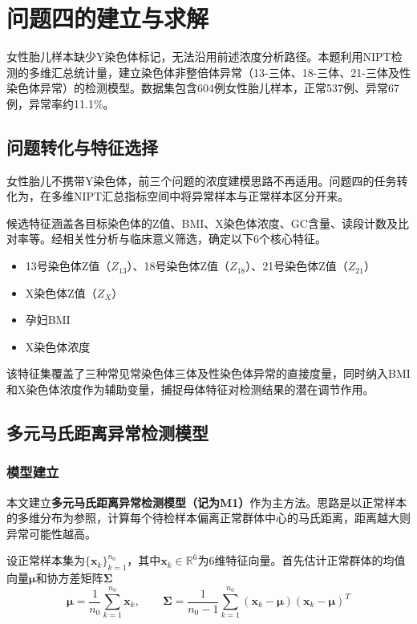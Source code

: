 \section{问题四的建立与求解}

女性胎儿样本缺少Y染色体标记，无法沿用前述浓度分析路径。本题利用NIPT检测的多维汇总统计量，建立染色体非整倍体异常（13-三体、18-三体、21-三体及性染色体异常）的检测模型。数据集包含604例女性胎儿样本，正常537例、异常67例，异常率约11.1\%。

\subsection{问题转化与特征选择}

女性胎儿不携带Y染色体，前三个问题的浓度建模思路不再适用。问题四的任务转化为，在多维NIPT汇总指标空间中将异常样本与正常样本区分开来。

候选特征涵盖各目标染色体的Z值、BMI、X染色体浓度、GC含量、读段计数及比对率等。经相关性分析与临床意义筛选，确定以下6个核心特征。

\begin{itemize}
  \item 13号染色体Z值（$Z_{13}$）、18号染色体Z值（$Z_{18}$）、21号染色体Z值（$Z_{21}$）
  \item X染色体Z值（$Z_X$）
  \item 孕妇BMI
  \item X染色体浓度
\end{itemize}

该特征集覆盖了三种常见常染色体三体及性染色体异常的直接度量，同时纳入BMI和X染色体浓度作为辅助变量，捕捉母体特征对检测结果的潜在调节作用。

\subsection{多元马氏距离异常检测模型}

\subsubsection{模型建立}

本文建立\textbf{多元马氏距离异常检测模型（记为M1）}作为主方法。思路是以正常样本的多维分布为参照，计算每个待检样本偏离正常群体中心的马氏距离，距离越大则异常可能性越高。

设正常样本集为$\{\mathbf{x}_k\}_{k=1}^{n_0}$，其中$\mathbf{x}_k \in \mathbb{R}^6$为6维特征向量。首先估计正常群体的均值向量$\boldsymbol{\mu}$和协方差矩阵$\boldsymbol{\Sigma}$
\begin{equation}
  \boldsymbol{\mu} = \frac{1}{n_0}\sum_{k=1}^{n_0}\mathbf{x}_k, \qquad
  \boldsymbol{\Sigma} = \frac{1}{n_0-1}\sum_{k=1}^{n_0}(\mathbf{x}_k - \boldsymbol{\mu})(\mathbf{x}_k - \boldsymbol{\mu})^T
\end{equation}

